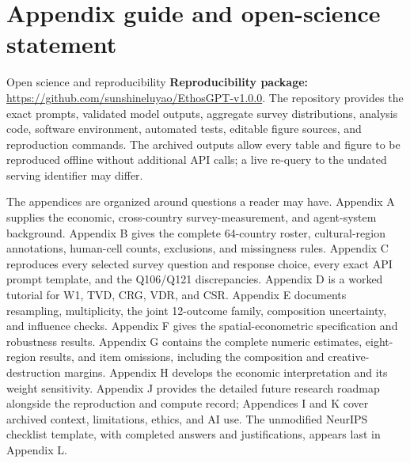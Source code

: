 \section*{Appendix guide and open-science statement}

\begin{auditbox}{Open science and reproducibility}
\textbf{Reproducibility package:}
\url{https://github.com/sunshineluyao/EthosGPT-v1.0.0}.
The repository provides the exact prompts, validated model outputs, aggregate
survey distributions, analysis code, software environment, automated tests,
editable figure sources, and reproduction commands. The archived outputs allow every table and figure to be reproduced offline without
additional API calls; a live re-query to the undated serving identifier may differ.
\end{auditbox}

The appendices are organized around questions a reader may have. Appendix A supplies the
economic, cross-country survey-measurement, and agent-system background. Appendix B gives the complete
64-country roster, cultural-region annotations, human-cell counts, exclusions, and
missingness rules. Appendix C reproduces every selected survey question and response
choice, every exact API prompt template, and the Q106/Q121 discrepancies. Appendix D is a worked
tutorial for W1, TVD, CRG, VDR, and CSR. Appendix E documents resampling,
multiplicity, the joint 12-outcome family, composition uncertainty, and influence checks.
Appendix F gives the spatial-econometric specification and robustness results. Appendix
G contains the complete numeric estimates, eight-region results, and item omissions, including the composition and
creative-destruction margins. Appendix H develops the economic interpretation and its
weight sensitivity. Appendix J provides the detailed future research roadmap alongside
the reproduction and compute record; Appendices I and K cover archived context,
limitations, ethics, and AI use. The unmodified NeurIPS checklist template, with completed
answers and justifications, appears last in Appendix L.

